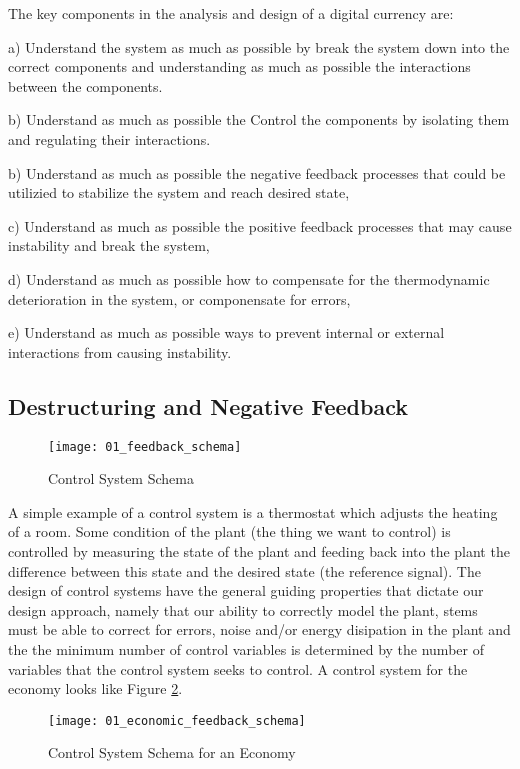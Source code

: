 The key components in the analysis and design of a digital currency are:

a) Understand the system as much as possible by break the system down into the correct components
and understanding as much as possible the interactions between the components.

b) Understand as much as possible the Control the components by isolating them and regulating their
interactions.

b) Understand as much as possible the  negative feedback processes that could be utilizied to
stabilize the system and reach desired state,

c) Understand as much as possible the positive feedback processes that may cause instability and
break the system,

d) Understand as much as possible how to compensate for the thermodynamic deterioration in the
system, or componensate for errors,

e) Understand as much as possible ways to prevent internal or external interactions from causing instability.

\subsection{Destructuring and Negative Feedback}

\begin{figure}
\texttt{[image: 01\_feedback\_schema]}
\caption{Control System Schema}
\label{fig:feedback_schema}
\end{figure}

A simple example of a control system is a thermostat which adjusts the heating of a room. Some
condition of the plant (the thing we want to control) is controlled by measuring the state of the
plant and feeding back into the plant the difference between this state and the desired state (the
reference signal). The design of control systems have the general guiding properties that dictate
our design approach, namely that our ability to correctly model the plant, stems must be able to
correct for errors, noise and/or energy disipation in the plant and the the minimum number of
control variables is determined by the number of variables that the control system seeks to control.
A control system for the economy looks like Figure \ref{fig:economic_feedback_schema}.

\begin{figure}
\centering
\texttt{[image: 01\_economic\_feedback\_schema]}
\caption{Control System Schema for an Economy}
\label{fig:economic_feedback_schema}
\end{figure}

